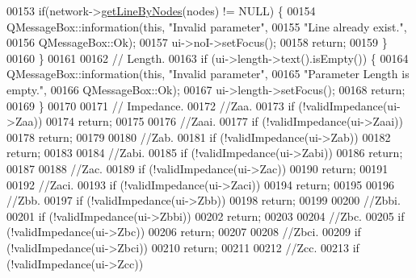 \begin{DoxyCode}
00153     \textcolor{keywordflow}{if}(network->\hyperlink{group___models_ga8f090b85a7779695cb9f05b6395b3044}{getLineByNodes}(nodes) != NULL) \{
00154       QMessageBox::information(\textcolor{keyword}{this}, \textcolor{stringliteral}{"Invalid parameter"},
00155                                \textcolor{stringliteral}{"Line already exist."},
00156                                QMessageBox::Ok);
00157       ui->noI->setFocus();
00158       \textcolor{keywordflow}{return};
00159     \}
00160   \}
00161 
00162   \textcolor{comment}{// Length.}
00163   \textcolor{keywordflow}{if} (ui->length->text().isEmpty()) \{
00164     QMessageBox::information(\textcolor{keyword}{this}, \textcolor{stringliteral}{"Invalid parameter"},
00165                              \textcolor{stringliteral}{"Parameter Length is empty."},
00166                              QMessageBox::Ok);
00167     ui->length->setFocus();
00168     \textcolor{keywordflow}{return};
00169   \}
00170 
00171   \textcolor{comment}{// Impedance.}
00172   \textcolor{comment}{//Zaa.}
00173   \textcolor{keywordflow}{if} (!validImpedance(ui->Zaa))
00174     \textcolor{keywordflow}{return};
00175 
00176   \textcolor{comment}{//Zaai.}
00177   \textcolor{keywordflow}{if} (!validImpedance(ui->Zaai))
00178     \textcolor{keywordflow}{return};
00179 
00180   \textcolor{comment}{//Zab.}
00181   \textcolor{keywordflow}{if} (!validImpedance(ui->Zab))
00182     \textcolor{keywordflow}{return};
00183 
00184   \textcolor{comment}{//Zabi.}
00185   \textcolor{keywordflow}{if} (!validImpedance(ui->Zabi))
00186     \textcolor{keywordflow}{return};
00187 
00188   \textcolor{comment}{//Zac.}
00189   \textcolor{keywordflow}{if} (!validImpedance(ui->Zac))
00190     \textcolor{keywordflow}{return};
00191 
00192   \textcolor{comment}{//Zaci.}
00193   \textcolor{keywordflow}{if} (!validImpedance(ui->Zaci))
00194     \textcolor{keywordflow}{return};
00195 
00196   \textcolor{comment}{//Zbb.}
00197   \textcolor{keywordflow}{if} (!validImpedance(ui->Zbb))
00198     \textcolor{keywordflow}{return};
00199 
00200   \textcolor{comment}{//Zbbi.}
00201   \textcolor{keywordflow}{if} (!validImpedance(ui->Zbbi))
00202     \textcolor{keywordflow}{return};
00203 
00204   \textcolor{comment}{//Zbc.}
00205   \textcolor{keywordflow}{if} (!validImpedance(ui->Zbc))
00206     \textcolor{keywordflow}{return};
00207 
00208   \textcolor{comment}{//Zbci.}
00209   \textcolor{keywordflow}{if} (!validImpedance(ui->Zbci))
00210     \textcolor{keywordflow}{return};
00211 
00212   \textcolor{comment}{//Zcc.}
00213   \textcolor{keywordflow}{if} (!validImpedance(ui->Zcc))

\end{DoxyCode}

